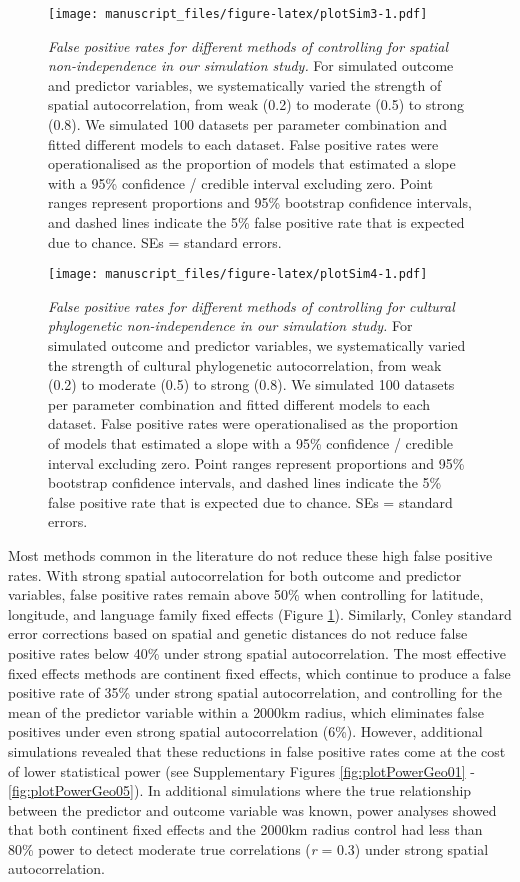 \documentclass[
  man,floatsintext]{apa6}
\begin{document}
\begin{figure}
\centering
\texttt{[image: manuscript\_files/figure-latex/plotSim3-1.pdf]}
\caption{\label{fig:plotSim3}\emph{False positive rates for different methods of controlling for spatial non-independence in our simulation study.} For simulated outcome and predictor variables, we systematically varied the strength of spatial autocorrelation, from weak (0.2) to moderate (0.5) to strong (0.8). We simulated 100 datasets per parameter combination and fitted different models to each dataset. False positive rates were operationalised as the proportion of models that estimated a slope with a 95\% confidence / credible interval excluding zero. Point ranges represent proportions and 95\% bootstrap confidence intervals, and dashed lines indicate the 5\% false positive rate that is expected due to chance. SEs = standard errors.}
\end{figure}



\begin{figure}
\centering
\texttt{[image: manuscript\_files/figure-latex/plotSim4-1.pdf]}
\caption{\label{fig:plotSim4}\emph{False positive rates for different methods of controlling for cultural phylogenetic non-independence in our simulation study.} For simulated outcome and predictor variables, we systematically varied the strength of cultural phylogenetic autocorrelation, from weak (0.2) to moderate (0.5) to strong (0.8). We simulated 100 datasets per parameter combination and fitted different models to each dataset. False positive rates were operationalised as the proportion of models that estimated a slope with a 95\% confidence / credible interval excluding zero. Point ranges represent proportions and 95\% bootstrap confidence intervals, and dashed lines indicate the 5\% false positive rate that is expected due to chance. SEs = standard errors.}
\end{figure}

Most methods common in the literature do not reduce these high false positive rates. With strong spatial autocorrelation for both outcome and predictor variables, false positive rates remain above 50\% when controlling for latitude, longitude, and language family fixed effects (Figure \ref{fig:plotSim3}). Similarly, Conley standard error corrections based on spatial and genetic distances do not reduce false positive rates below 40\% under strong spatial autocorrelation. The most effective fixed effects methods are continent fixed effects, which continue to produce a false positive rate of 35\% under strong spatial autocorrelation, and controlling for the mean of the predictor variable within a 2000km radius, which eliminates false positives under even strong spatial autocorrelation (6\%). However, additional simulations revealed that these reductions in false positive rates come at the cost of lower statistical power (see Supplementary Figures \ref{fig:plotPowerGeo01} - \ref{fig:plotPowerGeo05}). In additional simulations where the true relationship between the predictor and outcome variable was known, power analyses showed that both continent fixed effects and the 2000km radius control had less than 80\% power to detect moderate true correlations (\emph{r} = 0.3) under strong spatial autocorrelation.
\end{document}
